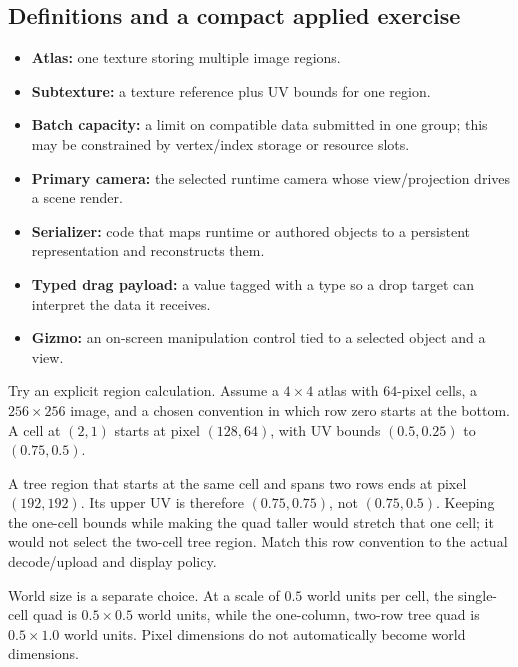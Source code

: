 \subsection{Definitions and a compact applied exercise}\label{06-engine-ii-ch026-definitions-and-a-compact-applied-exercise}

\hypertarget{06-engine-ii-ch026-definitions-and-a-compact-applied-exercise}{}

\begin{itemize}
\tightlist
\item
  \textbf{Atlas:} one texture storing multiple image regions.
\item
  \textbf{Subtexture:} a texture reference plus UV bounds for one region.
\item
  \textbf{Batch capacity:} a limit on compatible data submitted in one group; this may be constrained by vertex/index storage or resource slots.
\item
  \textbf{Primary camera:} the selected runtime camera whose view/projection drives a scene render.
\item
  \textbf{Serializer:} code that maps runtime or authored objects to a persistent representation and reconstructs them.
\item
  \textbf{Typed drag payload:} a value tagged with a type so a drop target can interpret the data it receives.
\item
  \textbf{Gizmo:} an on-screen manipulation control tied to a selected object and a view.
\end{itemize}

Try an explicit region calculation. Assume a \(4\times4\) atlas with \(64\)-pixel cells, a \(256\times256\) image, and a chosen convention in which row zero starts at the bottom. A cell at \((2,1)\) starts at pixel \((128,64)\), with UV bounds \((0.5,0.25)\) to \((0.75,0.5)\).

A tree region that starts at the same cell and spans two rows ends at pixel \((192,192)\). Its upper UV is therefore \((0.75,0.75)\), not \((0.75,0.5)\). Keeping the one-cell bounds while making the quad taller would stretch that one cell; it would not select the two-cell tree region. Match this row convention to the actual decode/upload and display policy.

World size is a separate choice. At a scale of \(0.5\) world units per cell, the single-cell quad is \(0.5\times0.5\) world units, while the one-column, two-row tree quad is \(0.5\times1.0\) world units. Pixel dimensions do not automatically become world dimensions.

